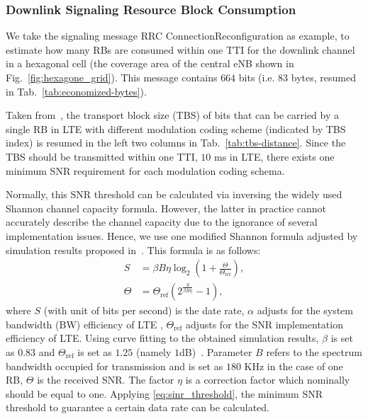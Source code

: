 \subsubsection{Downlink Signaling Resource Block Consumption}
We take the signaling message RRC ConnectionReconfiguration as example, to estimate how many RBs are consumed within one TTI for the downlink channel in a hexagonal cell (the coverage area of the central eNB shown in Fig.~\ref{fig:hexagone_grid}). This message contains $664$ bits (i.e. $83$ bytes, resumed in Tab.~\ref{tab:economized-bytes}).

Taken from~\cite[Tab.~7.1.7.2.1-1]{lte-eutra-physical-layer}, the transport block size (TBS) of bits that can be carried by a single RB in LTE with different modulation coding scheme (indicated by TBS index) is resumed in the left two columns in Tab.~\ref{tab:tbs-distance}. Since the TBS should be transmitted within one TTI, $10$ ms in LTE, there exists one minimum SNR requirement for each modulation coding schema. 

Normally, this SNR threshold can be calculated via inversing the widely used Shannon channel capacity formula. However, the latter in practice cannot accurately describe the channel capacity due to the ignorance of several implementation issues. Hence, we use one modified Shannon formula adjusted by simulation results proposed in~\cite{mogensen2007lte}. This formula is as follows:
\begin{align}
	\label{eq:debit_with_respect_sinr}
	S &= \beta B \eta  \log_2 \left( 1 + \frac{\Theta}{\Theta_{\text{ref}}} \right) , \\
	\label{eq:sinr_threshold}
	\Theta &= \Theta_{\text{ref}} \left(  2^{\frac{S}{\beta B \eta  }} - 1 \right) ,
\end{align}
where $S$ (with unit of bits per second) is the date rate, $\alpha$ adjusts for the system bandwidth (BW) efficiency of LTE , $\Theta_{\text{ref}}$ adjusts for the SNR implementation efficiency of LTE.  Using curve fitting to the obtained simulation results, $\beta$ is set as $0.83$ and $\Theta_{\text{ref}}$ is set as $1.25$ (namely $1$dB)~\cite{mogensen2007lte}.  Parameter $B$ refers to the spectrum bandwidth occupied for transmission and is set as $180$ KHz in the case of one RB, $\Theta$ is the received SNR. The factor $\eta$ is a correction factor which nominally should be equal to one. Applying \eqref{eq:sinr_threshold}, the minimum SNR threshold to guarantee a certain data rate  can be calculated.

